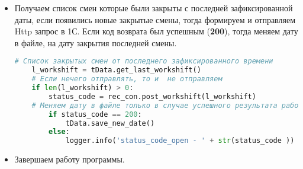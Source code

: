 \begin{itemize}
\newpage
\item Получаем список смен которые были закрыты с последней зафиксированной даты, если появились новые закрытые смены, тогда формируем и отправляем Http запрос в 1С. 
Если код возврата был успешным (\textbf{200}), тогда меняем дату в файле, на дату закрытия последней смены.
\newline
	\begin{lstlisting}[language=Python, caption=Закрытые смены]
	# Список закрытых смен от последнего зафиксированного времени
	l_workshift = tData.get_last_workshift()
	# Если нечего отправлять, то и  не отправляем
	if len(l_workshift) > 0:
		status_code = rec_con.post_workshift(l_workshift)
	# Меняем дату в файле только в случае успешного результата работы 1C
		if status_code == 200:
			tData.save_new_date()
		else:
			logger.info('status_code_open - ' + str(status_code ))
	\end{lstlisting}


\item Завершаем работу программы.

\end{itemize}
